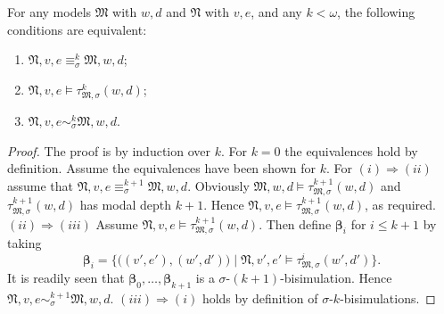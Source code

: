 \documentclass{lmcs} %
\theoremstyle{plain}\newtheorem{satz}[thm]{Satz} %
\newcommand{\bs}{\boldsymbol{\beta}}
\begin{document}
\begin{lem}\label{lem:new3}
	For any models $\mathfrak{M}$ with $w,d$ and $\mathfrak{N}$ with $v,e$, and any $k < \omega$,  the following conditions are equivalent\textup{:} 
	\begin{enumerate}[style=multiline,leftmargin=0.8cm]
		\item[$(i)$] $\mathfrak{N},v,e \equiv_{\sigma}^{k} \mathfrak{M},w,d$\textup{;}
		\item[$(ii)$] $\mathfrak{N},v,e \models \tau_{\mathfrak{M},\sigma}^{k}(w,d)$\textup{;}
		\item[$(iii)$] $\mathfrak{N},v,e \sim_{\sigma}^{k} \mathfrak{M},w,d$.
	\end{enumerate}
\end{lem} 
%
\begin{proof}
	The proof is by induction over $k$. For $k=0$ the equivalences hold by definition. Assume the equivalences have been shown for $k$. For $(i) \Rightarrow (ii)$ assume that $\mathfrak{N},v,e \equiv_{\sigma}^{k+1} \mathfrak{M},w,d$. Obviously $\mathfrak{M},w,d \models \tau_{\mathfrak{M},\sigma}^{k+1}(w,d)$ and $\tau_{\mathfrak{M},\sigma}^{k+1}(w,d)$ has modal depth $k+1$. Hence
	$\mathfrak{N},v,e \models \tau_{\mathfrak{M},\sigma}^{k+1}(w,d)$, as required.
	$(ii) \Rightarrow (iii)$
	Assume $\mathfrak{N},v,e\models \tau_{\mathfrak{M},\sigma}^{k+1}(w,d)$. Then define $\bs_i$ for $i\leq k+1$ by taking
	$$
	\bs_{i} = \bigl\{\bigl((v',e'),(w',d')\bigr) \mid \mathfrak{N},v',e' \models \tau_{\mathfrak{M},\sigma}^{i}(w',d')\bigr\}.
	$$
	It is readily seen that $\bs_{0},\dots,\bs_{k+1}$ is a $\sigma$-$(k+1)$-bisimulation. Hence $\mathfrak{N},v,e \sim_{\sigma}^{k+1} \mathfrak{M},w,d$.
	$(iii) \Rightarrow (i)$ holds by definition
	of $\sigma$-$k$-bisimulations. 
\end{proof}	
\end{document}
